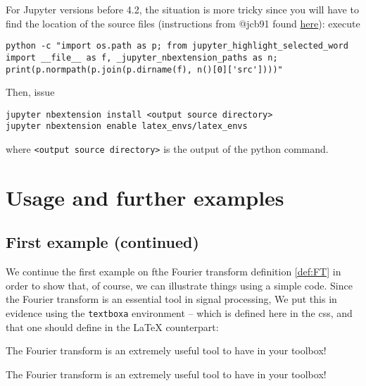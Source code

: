 For Jupyter versions before 4.2, the situation is more tricky since you
will have to find the location of the source files (instructions from
@jcb91 found
\href{https://github.com/jcb91/jupyter_highlight_selected_word}{here}):
execute

\begin{verbatim}
python -c "import os.path as p; from jupyter_highlight_selected_word import __file__ as f, _jupyter_nbextension_paths as n; print(p.normpath(p.join(p.dirname(f), n()[0]['src'])))"
\end{verbatim}

Then, issue

\begin{verbatim}
jupyter nbextension install <output source directory>
jupyter nbextension enable latex_envs/latex_envs
\end{verbatim}

where \texttt{\textless{}output\ source\ directory\textgreater{}} is the
output of the python command.

    \section{Usage and further examples}\label{usage-and-further-examples}

    \subsection{First example (continued)}\label{first-example-continued}

    We continue the first example on fthe Fourier transform definition
\ref{def:FT} in order to show that, of course, we can illustrate things
using a simple code. Since the Fourier transform is an essential tool in
signal processing, We put this in evidence using the \texttt{textboxa}
environment -- which is defined here in the css, and that one should
define in the LaTeX counterpart:

\begin{listing}
\begin{textboxa}
The Fourier transform is an extremely useful tool to have in your toolbox!
\end{textboxa}
\end{listing}

    \begin{textboxa}
The Fourier transform is an extremely useful tool to have in your toolbox!
\end{textboxa}

